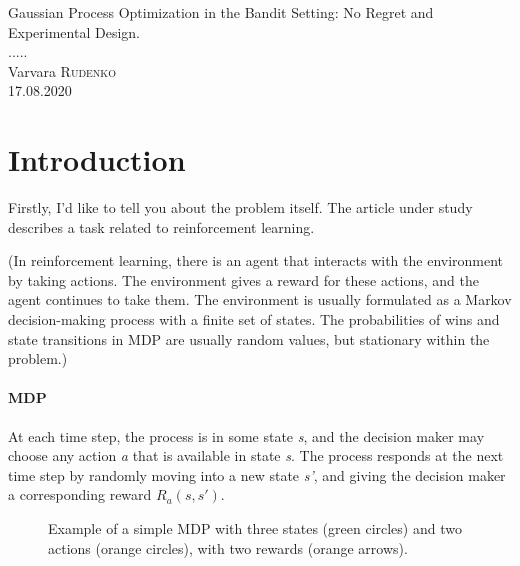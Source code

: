 \documentclass{article}
\begin{document}
\begin{titlepage}
		\begin{center}
			\vspace*{12em}
			\large{Gaussian Process Optimization in the Bandit Setting: No Regret and Experimental Design.}\\
			\vspace{3em}
			\normalsize{.....}\\
			\vspace{6em}
			\small{Varvara \textsc{Rudenko}}\\
			\vspace{5em}
			\small{17.08.2020}\\
			\thispagestyle{empty}
		\end{center}                             
	\end{titlepage}

\newpage
	\tableofcontents
\newpage

\section{Introduction}
Firstly, I'd like to tell you about the problem itself. The article under study describes a task related to reinforcement learning. 

(In reinforcement learning, there is an agent that interacts with the environment by taking actions. The environment gives a reward for these actions, and the agent continues to take them. The environment is usually formulated as a Markov decision-making process with a finite set of states. The probabilities of wins and state transitions in MDP are usually random values, but stationary within the problem.)

\paragraph{MDP}
At each time step, the process is in some state  \textit{s}, and the decision maker may choose any action \textit{a} that is available in state \textit{s}. The process responds at the next time step by randomly moving into a new state \textit{s'}, and giving the decision maker a corresponding reward \textit{${R_{a}(s,s')}$}. 

\begin{figure}[h!]
	\caption{Example of a simple MDP with three states (green circles) and two actions (orange circles), with two rewards (orange arrows).}
\end{figure}
\end{document}
